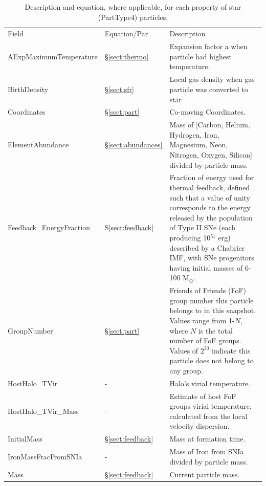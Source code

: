 \documentclass[10pt, a4paper]{article}
\newcommand{\groupnumber}{Friends of Friends (FoF) group number this particle
belongs to in this snapshot. Values range from 1-$N$, where $N$ is the total
number of FoF groups. Values of $2^{30}$ indicate this particle does not belong
to any group.}
\begin{document}
\begin{table}
\label{table:star}
\caption{Description and equation, where applicable, for each property of star
(PartType4) particles.}
\begin{center}
\footnotesize
\renewcommand{\arraystretch}{1.5}
\begin{tabular}{>{\ttfamily}p{4cm}p{1.5cm}p{11cm}}
\multicolumn{3}{l}{\large \bf PartType4: Stars} \\
\hline
Field & Equation/Par & Description \\ \hline\hline

AExpMaximumTemperature &
\S\ref{sect:thermo} &
Expansion factor a when particle had highest temperature. \\

BirthDensity &
\S\ref{sect:sfr} & Local gas density when gas particle was converted to star\\

Coordinates &
\S\ref{sect:part} &
Co-moving Coordinates. \\

ElementAbundance &
\S\ref{sect:abundances} &
Mass of [Carbon, Helium, Hydrogen, Iron, Magnesium, Neon, Nitrogen, Oxygen,
Silicon] divided by particle mass. \\

Feedback\_EnergyFraction &
S\ref{sect:feedback} &
Fraction of energy used for thermal feedback, defined such that a value of
unity corresponds to the energy released by the population of Type II SNe (each
producing 10$^{51}$ erg) described by a Chabrier IMF, with SNe progenitors
having initial masses of 6-100 M$_{\odot}$. \\

GroupNumber &
\S\ref{sect:part} &
\groupnumber \\

HostHalo\_TVir &
- &
Halo's virial temperature. \\

HostHalo\_TVir\_Mass &
- &
Estimate of host FoF groups virial temperature, calculated from the local
velocity dispersion. \\

InitialMass &
\S\ref{sect:feedback} &
Mass at formation time. \\

IronMassFracFromSNIa &
- & Mass of Iron from SNIa divided by particle mass. \\

Mass &
\S\ref{sect:feedback} & Current particle mass. \\


\end{tabular}
\end{center}
\end{table}
\end{document}
